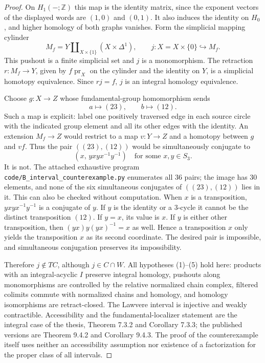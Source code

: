 \begin{proof}
On $H_1(-;\mathbb Z)$ this map is the identity matrix, since the exponent
vectors of the displayed words are $(1,0)$ and $(0,1)$.  It also induces the
identity on $H_0$, and higher homology of both graphs vanishes.
Form the simplicial mapping cylinder
\[
       M_f=Y\amalg_{X\times\{1\}}(X\times\Delta^1),
       \qquad j:X=X\times\{0\}\hookrightarrow M_f.
\]
This pushout is a finite simplicial set and $j$ is a monomorphism.  The
retraction $r:M_f\to Y$, given by $f\operatorname{pr}_X$ on the cylinder
and the identity on $Y$, is a simplicial homotopy equivalence.  Since
$rj=f$, $j$ is an integral homology equivalence.

Choose $g:X\to Z$ whose fundamental-group homomorphism sends
\[
       a\longmapsto(23),\qquad b\longmapsto(12).
\]
Such a map is explicit: label one positively traversed edge in each source
circle with the indicated group element and all its other edges with the
identity.  An extension $M_f\to Z$ would restrict to a map $v:Y\to Z$
and a homotopy between $g$ and $vf$.  Thus the pair $((23),(12))$ would be
simultaneously conjugate to
\[
             (x,\,yxyx^{-1}y^{-1})
                  \quad\text{for some }x,y\in S_3.
\]
It is not.  The attached exhaustive program
\texttt{code/B\_interval\_counterexample.py} enumerates all 36 pairs;
the image has 30 elements, and none of the six simultaneous conjugates of
$((23),(12))$ lies in it.  This can also be checked without computation.
When $x$ is a transposition, $yxyx^{-1}y^{-1}$ is a conjugate of $y$.
If $y$ is the identity or a 3-cycle it cannot be the distinct transposition
$(12)$.  If $y=x$, its value is $x$.  If $y$ is either other transposition,
then $(yx)y(yx)^{-1}=x$ as well.  Hence a transposition $x$ only yields the
transposition $x$ as its second coordinate.  The desired pair is impossible,
and simultaneous conjugation preserves its impossibility.

Therefore $j\notin TC$, although $j\in C\cap W$.  All hypotheses (1)--(5)
hold here: products with an integral-acyclic $I$ preserve integral homology,
pushouts along monomorphisms are controlled by the relative normalized
chain complex, filtered colimits commute with normalized chains and homology,
and homology isomorphisms are retract-closed.  The Lawvere interval is
injective and weakly contractible.  Accessibility and the fundamental-localizer
statement are the integral case of the thesis, Theorem 7.3.2 and
Corollary 7.3.3; the published versions are Theorem 9.4.2 and
Corollary 9.4.3.  The proof of the counterexample itself uses neither an
accessibility assumption nor existence of a factorization for the proper
class of all intervals.
\end{proof}

